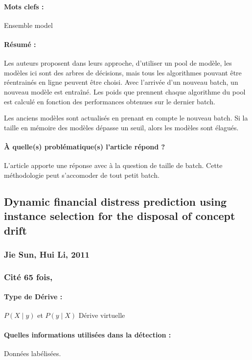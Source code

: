 \documentclass[11pt,a4paper]{report}
\begin{document}
\paragraph{Mots clefs :} Ensemble model

\paragraph{Résumé :} Les auteurs proposent dans leurs approche, d'utiliser un pool de modèle, les modèles ici sont des arbres de décisions, mais tous les algorithmes pouvant être réentrainés en ligne peuvent être choisi. Avec l'arrivée d'un nouveau batch, un nouveau modèle est entraîné. Les poids que prennent chaque algorithme du pool est calculé en fonction des performances obtenues sur le dernier batch. 

Les anciens modèles sont actualisés en prenant en compte le nouveau batch. Si la taille en mémoire des modèles dépasse un seuil, alors les modèles sont élagués.

\paragraph{À quelle(s) problématique(s) l'article répond ?} L'article apporte une réponse avec à la question de taille de batch. Cette méthodologie peut s'accomoder de tout petit batch.







\subsection{Dynamic financial distress prediction using instance selection for the disposal of concept drift}
\subsubsection{Jie Sun, Hui Li, 2011}

\subsubsection{Cité 65 fois, }

\paragraph{Type de Dérive :} $P(X\mid y)$ et $P(y \mid X)$ Dérive virtuelle
\paragraph{Quelles informations utilisées dans la détection :} Données labélisées.
\end{document}
